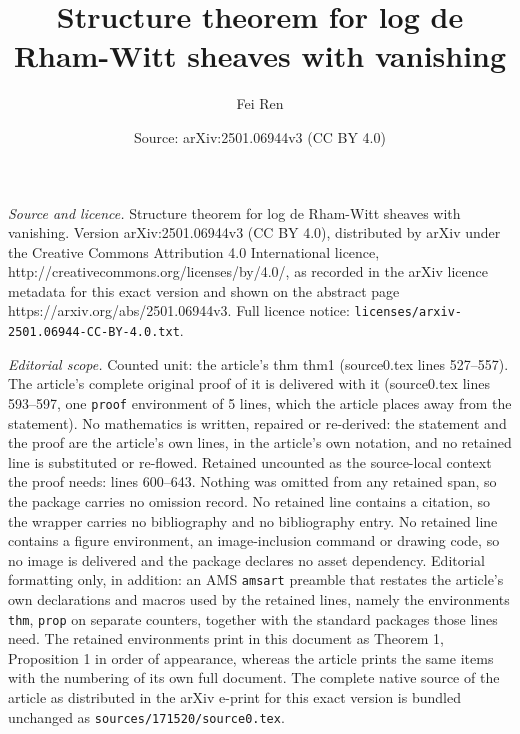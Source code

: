 \documentclass[10pt,a4paper]{amsart}
\title{Structure theorem for log de Rham-Witt sheaves with vanishing}
\author{Fei Ren}
\date{Source: arXiv:2501.06944v3 (CC BY 4.0)}
\begin{document}
\maketitle

\noindent\emph{Source and licence.} Structure theorem for log de Rham-Witt sheaves with vanishing. Version arXiv:2501.06944v3 (CC BY 4.0), distributed by arXiv under the Creative Commons Attribution 4.0 International licence, http://creativecommons.org/licenses/by/4.0/, as recorded in the arXiv licence metadata for this exact version and shown on the abstract page https://arxiv.org/abs/2501.06944v3. Full licence notice: \texttt{licenses/arxiv-2501.06944-CC-BY-4.0.txt}.\par\smallskip

\noindent\textit{Editorial scope.} Counted unit: the article's thm thm1 (source0.tex lines 527--557). The article's complete original proof of it is delivered with it (source0.tex lines 593--597, one \texttt{proof} environment of 5 lines, which the article places away from the statement). No mathematics is written, repaired or re-derived: the statement and the proof are the article's own lines, in the article's own notation, and no retained line is substituted or re-flowed.  Retained uncounted as the source-local context the proof needs: lines 600--643.  Nothing was omitted from any retained span, so the package carries no omission record.  No retained line contains a citation, so the wrapper carries no bibliography and no bibliography entry.  No retained line contains a figure environment, an image-inclusion command or drawing code, so no image is delivered and the package declares no asset dependency.  Editorial formatting only, in addition: an AMS \texttt{amsart} preamble that restates the article's own declarations and macros used by the retained lines, namely the environments \texttt{thm}, \texttt{prop} on separate counters, together with the standard packages those lines need.  The retained environments print in this document as Theorem 1, Proposition 1 in order of appearance, whereas the article prints the same items with the numbering of its own full document.  The complete native source of the article as distributed in the arXiv e-print for this exact version is bundled unchanged as \texttt{sources/171520/source0.tex}.
\end{document}

